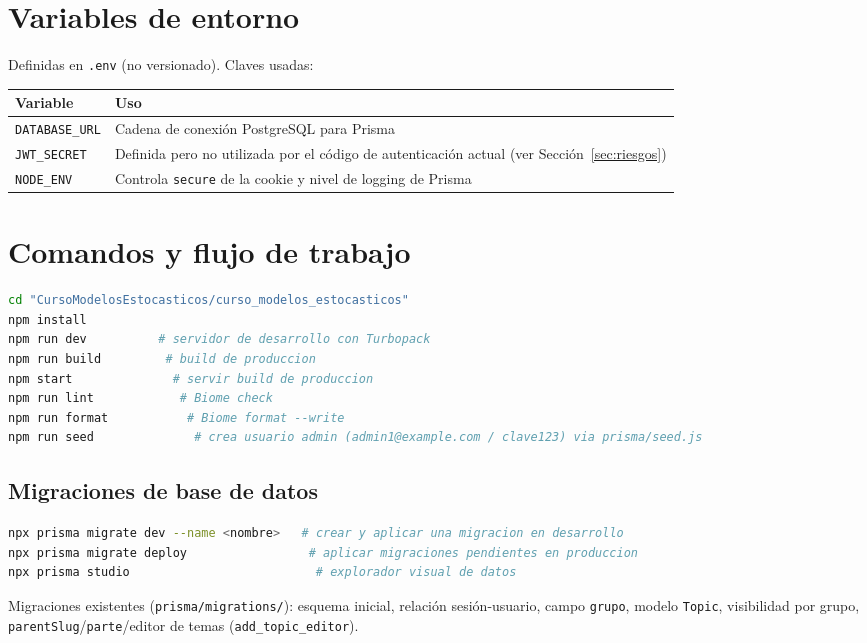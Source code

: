\documentclass[11pt,a4paper]{article}
\newcommand{\code}[1]{\texttt{#1}}
\begin{document}
\section{Variables de entorno}

Definidas en \code{.env} (no versionado). Claves usadas:

\begin{longtable}{@{}p{3.2cm}p{11.3cm}@{}}
\toprule
\textbf{Variable} & \textbf{Uso} \\
\midrule
\endhead
\code{DATABASE\_URL} & Cadena de conexión PostgreSQL para Prisma \\
\code{JWT\_SECRET} & Definida pero no utilizada por el código de autenticación actual (ver Sección~\ref{sec:riesgos}) \\
\code{NODE\_ENV} & Controla \code{secure} de la cookie y nivel de logging de Prisma \\
\bottomrule
\end{longtable}

\section{Comandos y flujo de trabajo}
\label{sec:comandos}

\begin{lstlisting}[language=bash]
cd "CursoModelosEstocasticos/curso_modelos_estocasticos"
npm install
npm run dev          # servidor de desarrollo con Turbopack
npm run build         # build de produccion
npm start              # servir build de produccion
npm run lint            # Biome check
npm run format           # Biome format --write
npm run seed              # crea usuario admin (admin1@example.com / clave123) via prisma/seed.js
\end{lstlisting}

\subsection{Migraciones de base de datos}

\begin{lstlisting}[language=bash]
npx prisma migrate dev --name <nombre>   # crear y aplicar una migracion en desarrollo
npx prisma migrate deploy                 # aplicar migraciones pendientes en produccion
npx prisma studio                          # explorador visual de datos
\end{lstlisting}

Migraciones existentes (\code{prisma/migrations/}): esquema inicial, relación sesión-usuario, campo \code{grupo}, modelo \code{Topic}, visibilidad por grupo, \code{parentSlug}/\code{parte}/editor de temas (\code{add\_topic\_editor}).
\end{document}
